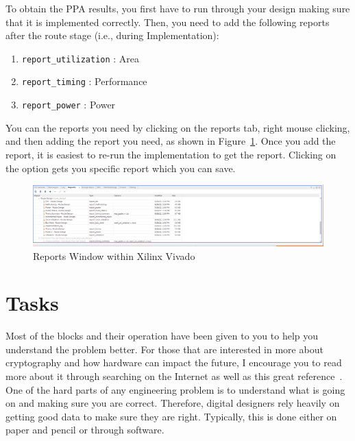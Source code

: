 \documentclass{article}
\begin{document}
To obtain the PPA results, you first have to run through your design
making sure that it is implemented correctly.  Then, you need to add
the following reports after the route stage (i.e., during
Implementation):
\begin{enumerate}
\item \verb!report_utilization! : Area
\item \verb!report_timing! : Performance
\item \verb!report_power! : Power
\end{enumerate}
You can the reports you need by clicking on the reports tab, right
mouse clicking, and then adding the report you need, as shown in
Figure~\ref{reports1.png}.  Once you add the report, it is easiest to
re-run the implementation to get the report.  Clicking on the option
gets you specific report which you can save.
\begin{figure} [t!]
  \centering
  \includegraphics[scale=0.3]{analysis.png}
  \caption{Reports Window within Xilinx Vivado}
  \label{reports1.png}
\end{figure}

  
\section{Tasks}

Most of the blocks and their operation
have been given to you to help you understand the
problem better.
For those that are interested in more about cryptography and how
hardware can impact the future, I encourage you to read more about it
through searching on the Internet as well as this great
reference~\cite{10.5555/1721909}.
One of the hard parts of any engineering problem is
to understand what is going on and making sure you are correct.
Therefore, digital designers rely heavily on getting good data to make
sure they are right.  Typically, this is done either on paper and
pencil or through software.
\end{document}
